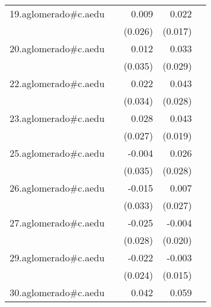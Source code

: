 {\begin{longtable}{l*{4}{D{.}{.}{-1}}}
\addlinespace
19.aglomerado#c.aedu&                     &       0.009         &       0.022         &                     \\
            &                     &     (0.026)         &     (0.017)         &                     \\
\addlinespace
20.aglomerado#c.aedu&                     &       0.012         &       0.033         &                     \\
            &                     &     (0.035)         &     (0.029)         &                     \\
\addlinespace
22.aglomerado#c.aedu&                     &       0.022         &       0.043         &                     \\
            &                     &     (0.034)         &     (0.028)         &                     \\
\addlinespace
23.aglomerado#c.aedu&                     &       0.028         &       0.043\sym{*}  &                     \\
            &                     &     (0.027)         &     (0.019)         &                     \\
\addlinespace
25.aglomerado#c.aedu&                     &      -0.004         &       0.026         &                     \\
            &                     &     (0.035)         &     (0.028)         &                     \\
\addlinespace
26.aglomerado#c.aedu&                     &      -0.015         &       0.007         &                     \\
            &                     &     (0.033)         &     (0.027)         &                     \\
\addlinespace
27.aglomerado#c.aedu&                     &      -0.025         &      -0.004         &                     \\
            &                     &     (0.028)         &     (0.020)         &                     \\
\addlinespace
29.aglomerado#c.aedu&                     &      -0.022         &      -0.003         &                     \\
            &                     &     (0.024)         &     (0.015)         &                     \\
\addlinespace
30.aglomerado#c.aedu&                     &       0.042         &       0.059\sym{*}  &                     \\

\end{longtable}}
